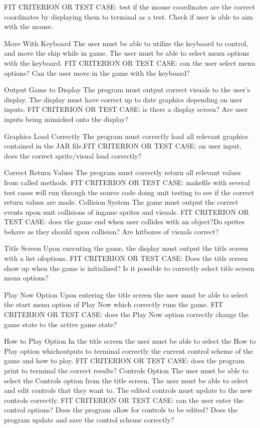 \documentclass[12pt, titlepage]{article}
\begin{document}
FIT CRITERION OR TEST CASE: test if the mouse coordinates are the correct
coordinates by displaying them to terminal as a test. Check if user is able to
aim with the mouse.


Move With Keyboard
The user must be able to utilize the keyboard to control, and move the ship
while in game. The user must be able to select menu options with the keyboard.
FIT CRITERION OR TEST CASE: can the user select menu options? Can the user move
in the game with the keyboard?


Output Game to Display
The program must output correct visuals to the user’s display. The display must
have correct up to date graphics depending on user inputs.
FIT CRITERION OR TEST CASE: is there a display screen? Are user inputs being
mimicked onto the display?


Graphics Load Correctly
The program must correctly load all relevant graphics contained in the JAR
file.FIT CRITERION OR TEST CASE: on user input, does the correct sprite/visual
load
correctly?


Correct Return Values
The program must correctly return all relevant values from called methods.
FIT CRITERION OR TEST CASE: makefile with several test cases will run through
the source code doing unit testing to see if the correct return values are made.
Collision System
The game must output the correct events upon unit collisions of ingame sprites
and visuals.
FIT CRITERION OR TEST CASE: does the game end when user collides with an
object?Do sprites behave as they should upon collision? Are hitboxes of visuals
correct?


Title Screen 
Upon executing the game, the display must output the title screen with a list
ofoptions.
FIT CRITERION OR TEST CASE: Does the title screen show up when the game is
initialized? Is it possible to correctly select title screen menu options?


Play Now Option
Upon entering the title screen the user must be able to select the start menu
option of Play Now which correctly runs the game.
FIT CRITERION OR TEST CASE: does the Play Now option correctly change the game
state to the active game state?


How to Play Option
In the title screen the user must be able to select the How to Play option
whichoutputs to terminal correctly the current control scheme of the game and
how to
play.
FIT CRITERION OR TEST CASE: does the program print to terminal the correct
results?
Controls Option
The user must be able to select the Controls option from the title screen. The
user must be able to select and edit controls that they want to. The edited
controls must update to the new controls correctly.
FIT CRITERION OR TEST CASE: can the user enter the control options? Does the
program allow for controls to be edited? Does the program update and save the
control scheme correctly?
\end{document}
